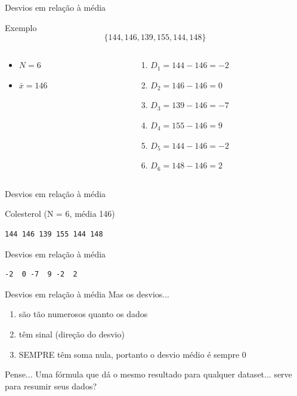 \documentclass{beamer}
\begin{document}
\begin{frame}{\scriptsize Desvios em relação à média}
\begin{exampleblock}{Exemplo}
    \scriptsize
  \begin{displaymath}
    \{144, 146, 139, 155, 144, 148\}
  \end{displaymath}
  \bigskip
  \begin{columns}
    \begin{column}{5cm}
  \begin{itemize}
    \scriptsize
  \item $N=6$
  \item $\bar{x} = 146$
  \end{itemize}
\end{column}
\begin{column}{5cm}
  \begin{enumerate}
    \tiny
  \item $D_1 = 144 - 146 = -2$
  \item $D_2 = 146 - 146 = 0$
  \item $D_3 = 139 - 146 = -7$
  \item $D_4 = 155 - 146 = 9$
  \item $D_5 = 144 - 146 = -2$
  \item $D_6 = 148 - 146 = 2$
  \end{enumerate}
\end{column}
\end{columns}
\end{exampleblock}
\end{frame}

\begin{frame}[fragile]{\scriptsize Desvios em relação à média}
  \begin{block}{Colesterol (N = 6, média 146)}
    \footnotesize
\begin{verbatim}
144 146 139 155 144 148
\end{verbatim}
  \end{block}
  \begin{block}{Desvios em relação à média}
    \footnotesize
\begin{verbatim}
-2  0 -7  9 -2  2
\end{verbatim}
  \end{block}
\end{frame}

\begin{frame}{\scriptsize Desvios em relação à média}
  \footnotesize
  Mas os desvios...
  \bigskip
  \begin{enumerate}
    \footnotesize
  \item são tão numerosos quanto os dados
    \bigskip
  \item têm sinal (direção do desvio)
    \bigskip
  \item SEMPRE têm soma \alert{nula}, portanto o desvio médio é sempre 0
  \end{enumerate}
  \bigskip
  \vfill
  \begin{block}{Pense...}
    \footnotesize
    Uma fórmula que dá o mesmo resultado para qualquer dataset... serve para resumir seus dados?
  \end{block}
\end{frame}
\end{document}
